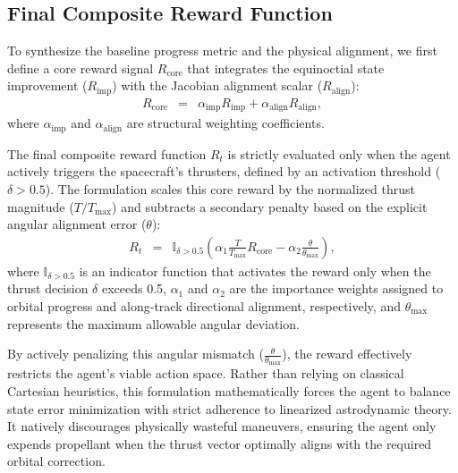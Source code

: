 \documentclass[paper]{ieice}
\begin{document}
\subsection{Final Composite Reward Function}
To synthesize the baseline progress metric and the physical alignment, we first define a core reward signal $R_{\mathrm{core}}$ that integrates the equinoctial state improvement ($R_{\mathrm{imp}}$) with the Jacobian alignment scalar ($R_{\mathrm{align}}$):
\begin{eqnarray}
    R_{\mathrm{core}}
    & = &
    \alpha_{\mathrm{imp}} R_{\mathrm{imp}} + \alpha_{\mathrm{align}} R_{\mathrm{align}},
\end{eqnarray}
where $\alpha_{\mathrm{imp}}$ and $\alpha_{\mathrm{align}}$ are structural weighting coefficients.

The final composite reward function $R_t$ is strictly evaluated only when the agent actively triggers the spacecraft's thrusters, defined by an activation threshold ($\delta > 0.5$). The formulation scales this core reward by the normalized thrust magnitude ($T/T_{\max}$) and subtracts a secondary penalty based on the explicit angular alignment error ($\theta$):
\begin{eqnarray}
    R_t
    & = &
    \mathbb{I}_{\delta > 0.5} \left( \alpha_1 \frac{T}{T_{\max}} R_{\mathrm{core}} - \alpha_2 \frac{\theta}{\theta_{\max}} \right),
\end{eqnarray}
where $\mathbb{I}_{\delta > 0.5}$ is an indicator function that activates the reward only when the thrust decision $\delta$ exceeds 0.5, $\alpha_1$ and $\alpha_2$ are the importance weights assigned to orbital progress and along-track directional alignment, respectively, and $\theta_{\max}$ represents the maximum allowable angular deviation.

By actively penalizing this angular mismatch ($\frac{\theta}{\theta_{\max}}$), the reward effectively restricts the agent's viable action space. Rather than relying on classical Cartesian heuristics, this formulation mathematically forces the agent to balance state error minimization with strict adherence to linearized astrodynamic theory. It natively discourages physically wasteful maneuvers, ensuring the agent only expends propellant when the thrust vector optimally aligns with the required orbital correction.
\end{document}
